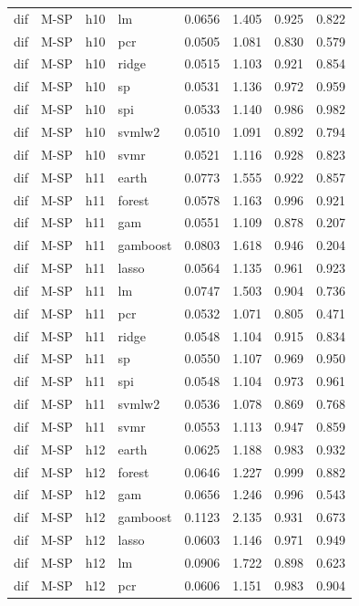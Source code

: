 \begin{ThreePartTable}
\begin{longtable}[t]{llclcccc}
dif & M-SP & h10 & lm & 0.0656 & 1.405 & 0.925 & 0.822\\
dif & M-SP & h10 & pcr & 0.0505 & 1.081 & 0.830 & 0.579\\
dif & M-SP & h10 & ridge & 0.0515 & 1.103 & 0.921 & 0.854\\
dif & M-SP & h10 & sp & 0.0531 & 1.136 & 0.972 & 0.959\\
dif & M-SP & h10 & spi & 0.0533 & 1.140 & 0.986 & 0.982\\
dif & M-SP & h10 & svmlw2 & 0.0510 & 1.091 & 0.892 & 0.794\\
dif & M-SP & h10 & svmr & 0.0521 & 1.116 & 0.928 & 0.823\\
\addlinespace
dif & M-SP & h11 & earth & 0.0773 & 1.555 & 0.922 & 0.857\\
dif & M-SP & h11 & forest & 0.0578 & 1.163 & 0.996 & 0.921\\
dif & M-SP & h11 & gam & 0.0551 & 1.109 & 0.878 & 0.207\\
dif & M-SP & h11 & gamboost & 0.0803 & 1.618 & 0.946 & 0.204\\
dif & M-SP & h11 & lasso & 0.0564 & 1.135 & 0.961 & 0.923\\
dif & M-SP & h11 & lm & 0.0747 & 1.503 & 0.904 & 0.736\\
dif & M-SP & h11 & pcr & 0.0532 & 1.071 & 0.805 & 0.471\\
dif & M-SP & h11 & ridge & 0.0548 & 1.104 & 0.915 & 0.834\\
dif & M-SP & h11 & sp & 0.0550 & 1.107 & 0.969 & 0.950\\
dif & M-SP & h11 & spi & 0.0548 & 1.104 & 0.973 & 0.961\\
dif & M-SP & h11 & svmlw2 & 0.0536 & 1.078 & 0.869 & 0.768\\
dif & M-SP & h11 & svmr & 0.0553 & 1.113 & 0.947 & 0.859\\
\addlinespace
dif & M-SP & h12 & earth & 0.0625 & 1.188 & 0.983 & 0.932\\
dif & M-SP & h12 & forest & 0.0646 & 1.227 & 0.999 & 0.882\\
dif & M-SP & h12 & gam & 0.0656 & 1.246 & 0.996 & 0.543\\
dif & M-SP & h12 & gamboost & 0.1123 & 2.135 & 0.931 & 0.673\\
dif & M-SP & h12 & lasso & 0.0603 & 1.146 & 0.971 & 0.949\\
dif & M-SP & h12 & lm & 0.0906 & 1.722 & 0.898 & 0.623\\
dif & M-SP & h12 & pcr & 0.0606 & 1.151 & 0.983 & 0.904\\

\end{longtable}
\end{ThreePartTable}
